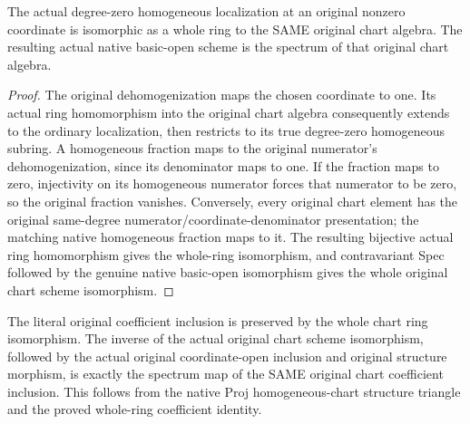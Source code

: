 \begin{theorem}
\label{thm:fc-native-rank-one-chart-comparison}
\leanok
{}
The actual degree-zero homogeneous localization at an original nonzero
coordinate is isomorphic as a whole ring to the SAME original chart
algebra. The resulting actual native basic-open scheme is the spectrum
of that original chart algebra.
\end{theorem}
\begin{proof}
The original dehomogenization maps the chosen coordinate to one. Its
actual ring homomorphism into the original chart algebra consequently
extends to the ordinary localization, then restricts to its true
degree-zero homogeneous subring. A homogeneous fraction maps to the
original numerator's dehomogenization, since its denominator maps to
one. If the fraction maps to zero, injectivity on its homogeneous
numerator forces that numerator to be zero, so the original fraction
vanishes. Conversely, every original chart element has the original
same-degree numerator/coordinate-denominator presentation; the matching
native homogeneous fraction maps to it. The resulting bijective actual
ring homomorphism gives the whole-ring isomorphism, and contravariant
Spec followed by the genuine native basic-open isomorphism gives the
whole original chart scheme isomorphism.
\end{proof}

The literal original coefficient inclusion is preserved by the whole chart ring isomorphism. The inverse of the actual original chart scheme isomorphism, followed by the actual original coordinate-open inclusion and original structure morphism, is exactly the spectrum map of the SAME original chart coefficient inclusion. This follows from the native Proj homogeneous-chart structure triangle and the proved whole-ring coefficient identity.
